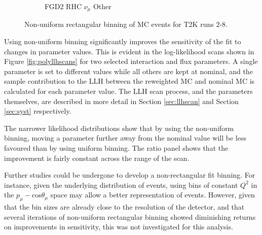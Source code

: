 \begin{figure}
\begin{subfigure}{.32\textwidth}
  \caption{FGD2 RHC $\nu_{\mu}$ Other}
  \label{fig:th2polyFGD2_NuMuBkg_CCOther_in_AntiNu_Mode}
\end{subfigure}
\caption{Non-uniform rectangular binning of MC events for T2K runs 2-8.}
\label{fig:th2polybin}
\end{figure}

Using non-uniform binning significantly improves the sensitivity of the fit to changes in parameter values. This is evident in the log-likelihood scans shown in Figure \ref{fig:polyllhscans} for two selected interaction and flux parameters. A single parameter is set to different values while all others are kept at nominal, and the sample contribution to the LLH between the reweighted MC and nominal MC is calculated for each parameter value. The LLH scan process, and the parameters themselves, are described in more detail in Section \ref{sec:llhscan} and Section \ref{sec:syst} respectively.

The narrower likelihood distributions show that by using the non-uniform binning, moving a parameter further away from the nominal value will be less favoured than by using uniform binning. The ratio panel shows that the improvement is fairly constant across the range of the scan.

Further studies could be undergone to develop a non-rectangular fit binning. For instance, given the underlying distribution of events, using bins of constant $Q^2$ in the $p_{\mu}-$cos$\theta_{\mu}$ space may allow a better representation of events. However, given that the bin sizes are already close to the resolution of the detector, and that several iterations of non-uniform rectangular binning showed diminishing returns on improvements in sensitivity, this was not investigated for this analysis.

